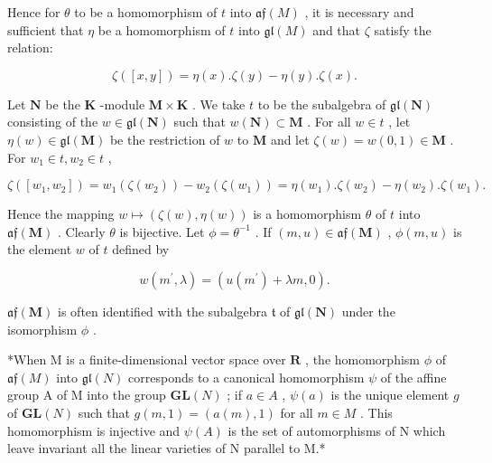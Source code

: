 Hence for \(\theta\) to be a homomorphism of \(t\) into \(\mathfrak{af}(M)\) , it is necessary and sufficient that \(\eta\) be a homomorphism of \(t\) into \(\mathfrak{gl}(M)\) and that \(\zeta\) satisfy the relation:

\[
\zeta ([ x, y ]) = \eta (x). \zeta (y) - \eta (y). \zeta (x).\tag{13}
\]

Let \(\mathbf{N}\) be the \(\mathbf{K}\) -module \(\mathbf{M} \times \mathbf{K}\) . We take \(t\) to be the subalgebra of \(\mathfrak{gl}(\mathbf{N})\) consisting of the \(w \in \mathfrak{gl}(\mathbf{N})\) such that \(w(\mathbf{N}) \subset \mathbf{M}\) . For all \(w \in t\) , let \(\eta(w) \in \mathfrak{gl}(\mathbf{M})\) be the restriction of \(w\) to \(\mathbf{M}\) and let \(\zeta(w) = w(0,1) \in \mathbf{M}\) . For \(w_1 \in t, w_2 \in t\) ,

\[
\zeta ([ w _ {1}, w _ {2} ]) = w _ {1} (\zeta (w _ {2})) - w _ {2} (\zeta (w _ {1})) = \eta (w _ {1}). \zeta (w _ {2}) - \eta (w _ {2}). \zeta (w _ {1}).
\]

Hence the mapping \(w \mapsto (\zeta(w), \eta(w))\) is a homomorphism \(\theta\) of \(t\) into \(\mathfrak{af}(\mathbf{M})\) . Clearly \(\theta\) is bijective. Let \(\phi = \theta^{-1}\) . If \((m, u) \in \mathfrak{af}(\mathbf{M})\) , \(\phi(m, u)\) is the element \(w\) of \(t\) defined by

\[
w (m ^ {\prime}, \lambda) = (u (m ^ {\prime}) + \lambda m, 0).
\]

\(\mathfrak{af}(\mathbf{M})\) is often identified with the subalgebra \(\mathfrak{t}\) of \(\mathfrak{gl}(\mathbf{N})\) under the isomorphism \(\phi\) .

*When M is a finite-dimensional vector space over \(\mathbf{R}\) , the homomorphism \(\phi\) of \(\mathfrak{af}(M)\) into \(\mathfrak{gl}(N)\) corresponds to a canonical homomorphism \(\psi\) of the affine group A of M into the group \(\mathbf{GL}(N)\) ; if \(a \in A\) , \(\psi(a)\) is the unique element \(g\) of \(\mathbf{GL}(N)\) such that \(g(m, 1) = (a(m), 1)\) for all \(m \in M\) . This homomorphism is injective and \(\psi(A)\) is the set of automorphisms of N which leave invariant all the linear varieties of N parallel to M.*

